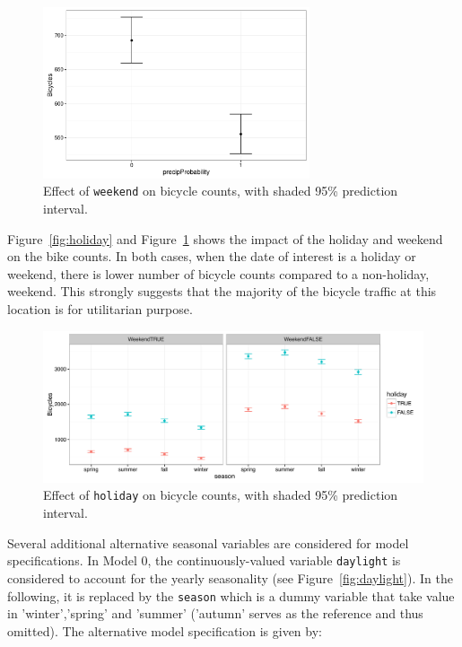 \documentclass [11pt, proquest] {uwthesis}[2015/03/03]
\begin{document}
\begin{figure}
\centering
  \includegraphics[width=0.7\textwidth]{figures/sim/Wknd}
  \caption{Effect of \texttt{weekend} on bicycle counts, with shaded 95\% prediction interval.}
  \label{fig:weekend}
\end{figure}

Figure~\ref{fig:holiday} and Figure~\ref{fig:weekend} shows the impact of the holiday and weekend on the bike counts. In both cases, when the date of interest is a holiday or weekend, there is lower number of bicycle counts compared to a non-holiday, weekend. This strongly suggests that the majority of the bicycle traffic at this location is for utilitarian purpose. 


\begin{figure}
\centering
  \includegraphics[width=1\textwidth]{figures/sim/multi} 
 \caption{Effect of \texttt{holiday} on bicycle counts, with shaded 95\% prediction interval.}
 \label{fig:multi}
\end{figure}


Several additional alternative seasonal variables are considered for model specifications. In Model 0,  the continuously-valued variable \texttt{daylight} is considered to account for the yearly seasonality (see Figure~\ref{fig:daylight}). In the following, it is replaced by the \texttt{season} which is a dummy variable that take value in 'winter','spring' and 'summer' ('autumn' serves as the reference and thus omitted). The alternative model specification is given by:
\end{document}

